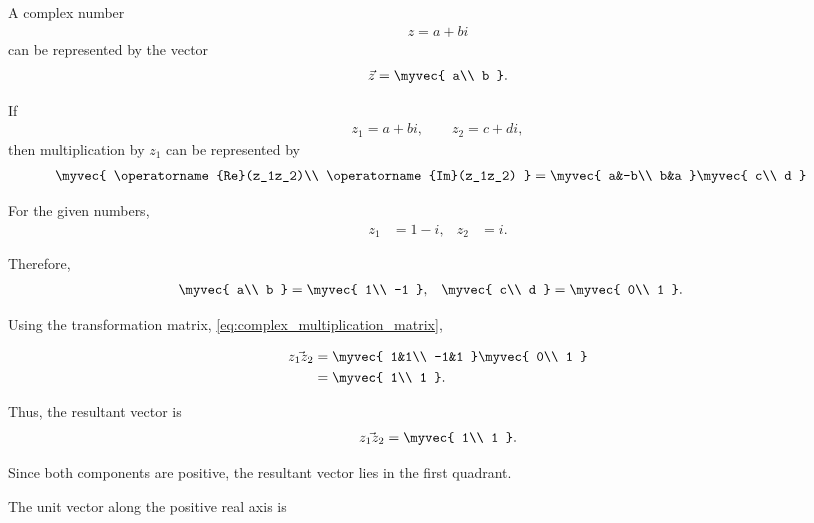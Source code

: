 \begin{enumerate}[label=\thesubsection.\arabic*, ref=\thesubsection.\theenumi,itemsep=0pt]
\solution

A complex number
\begin{align}
z=a+bi
\end{align}
can be represented by the vector
\begin{align}
\vec{z}
=
\myvec{
a\\
b
}.
\label{eq:q13_complex_vector}
\end{align}

If
\begin{align}
z_1=a+bi,
\qquad
z_2=c+di,
\end{align}
then multiplication by $z_1$ can be represented by
\begin{align}
\myvec{
\operatorname{Re}(z_1z_2)\\
\operatorname{Im}(z_1z_2)
}
&=
\myvec{
a&-b\\
b&a
}
\myvec{
c\\
d
}
\label{eq:q13_complex_transformation}
\end{align}

For the given numbers,
\begin{align}
z_1&=1-i,
&
z_2&=i.
\end{align}

Therefore,
\begin{align}
\myvec{
a\\
b
}
&=
\myvec{
1\\
-1
},
&
\myvec{
c\\
d
}
&=
\myvec{
0\\
1
}.
\end{align}

Using the transformation matrix, \eqref{eq:complex_multiplication_matrix},

\begin{align}
\vec{z_1z_2}
&=
\myvec{
1&1\\
-1&1
}
\myvec{
0\\
1
}
\\
&=
\myvec{
1\\
1
}.
\label{eq:q13_resultant_vector}
\end{align}

Thus, the resultant vector is
\begin{align}
\vec{z_1z_2}
=
\myvec{
1\\
1
}.
\end{align}

Since both components are positive, the resultant vector lies in the
first quadrant.

The unit vector along the positive real axis is


\end{enumerate}
